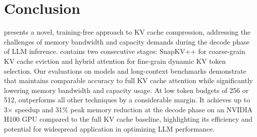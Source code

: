 \section{Conclusion}
\label{sec:6-conc}

\rocketkv presents a novel, training-free approach to KV cache compression, addressing the challenges of memory bandwidth and capacity demands during the decode phase of LLM inference. \rocketkv contains two consecutive stages: SnapKV++ for coarse-grain KV cache eviction and hybrid attention for fine-grain dynamic KV token selection. Our evaluations on models and long-context benchmarks demonstrate that \rocketkv maintains comparable accuracy to full KV cache attention while significantly lowering memory bandwidth and capacity usage. At low token budgets of 256 or 512, \rocketkv outperforms all other techniques by a considerable margin.  
It achieves up to 3$\times$ speedup and 31\% peak memory reduction at the decode phase on an NVIDIA H100 GPU compared to the full KV cache baseline, highlighting its efficiency and potential for widespread application in optimizing LLM performance.
